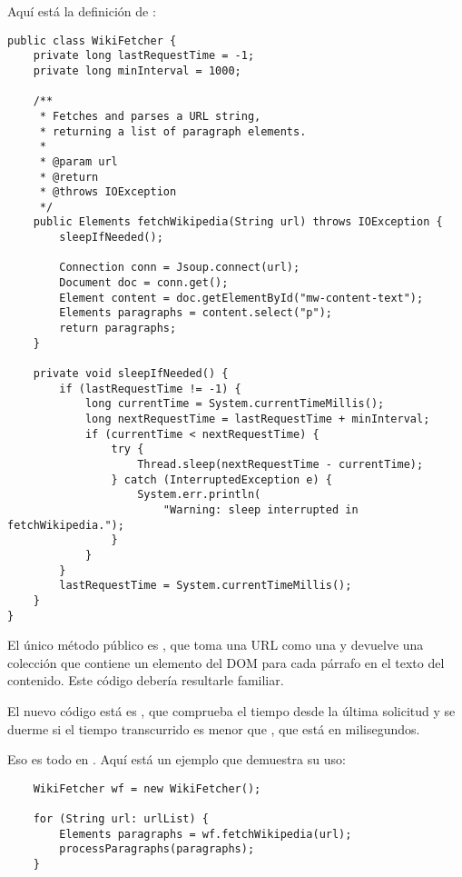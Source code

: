 \documentclass[12pt]{book}
\theoremstyle{exercise}
\begin{document}
Aquí está la definición de :

\begin{verbatim}
public class WikiFetcher {
    private long lastRequestTime = -1;
    private long minInterval = 1000;

    /**
     * Fetches and parses a URL string, 
     * returning a list of paragraph elements.
     *
     * @param url
     * @return
     * @throws IOException
     */
    public Elements fetchWikipedia(String url) throws IOException {
        sleepIfNeeded();

        Connection conn = Jsoup.connect(url);
        Document doc = conn.get();
        Element content = doc.getElementById("mw-content-text");
        Elements paragraphs = content.select("p");
        return paragraphs;
    }

    private void sleepIfNeeded() {
        if (lastRequestTime != -1) {
            long currentTime = System.currentTimeMillis();
            long nextRequestTime = lastRequestTime + minInterval;
            if (currentTime < nextRequestTime) {
                try {
                    Thread.sleep(nextRequestTime - currentTime);
                } catch (InterruptedException e) {
                    System.err.println(
                        "Warning: sleep interrupted in fetchWikipedia.");
                }
            }
        }
        lastRequestTime = System.currentTimeMillis();
    }
}
\end{verbatim}

El único método público es , que toma una URL como
una  y devuelve una colección  que contiene un
elemento del DOM para cada párrafo en el texto del contenido. Este código
debería resultarle familiar.


El nuevo código está es , que comprueba el tiempo desde
la última solicitud y se duerme si el tiempo transcurrido es menor que
, que está en milisegundos.

Eso es todo en . Aquí está un ejemplo que demuestra su uso:

\begin{verbatim}
    WikiFetcher wf = new WikiFetcher();

    for (String url: urlList) {
        Elements paragraphs = wf.fetchWikipedia(url);
        processParagraphs(paragraphs);
    }
\end{verbatim}
\end{document}
